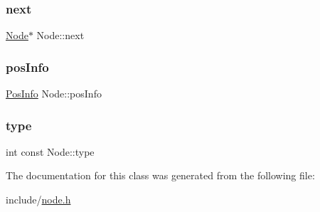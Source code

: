 \subsubsection{\texorpdfstring{next}{next}}
{\footnotesize\ttfamily \hyperlink{classNode}{Node}$\ast$ Node\+::next}

\mbox{\label{classNode_aa0e8a1e5aebdbe33183001b5a1c57111}} 
\subsubsection{\texorpdfstring{pos\+Info}{posInfo}}
{\footnotesize\ttfamily \hyperlink{classPosInfo}{Pos\+Info} Node\+::pos\+Info}

\mbox{\label{classNode_af4f536b1b3f60e197fe364ba56022291}} 
\subsubsection{\texorpdfstring{type}{type}}
{\footnotesize\ttfamily int const Node\+::type}



The documentation for this class was generated from the following file\+:\begin{DoxyCompactItemize}
\item 
include/\hyperlink{node_8h}{node.\+h}\end{DoxyCompactItemize}
